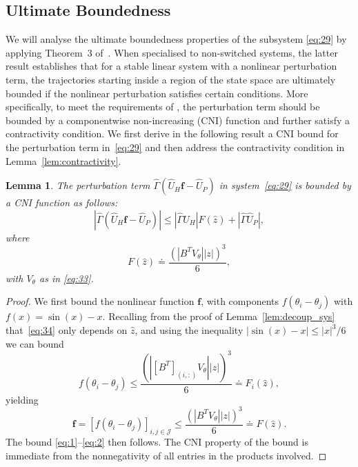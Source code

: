 \documentclass[letter, 10pt, conference]{ieeeconf}
\newtheorem{lemma}[theorem]{Lemma}
\newcommand{\J}{\mathcal{J}}
\newcommand{\1}{\mathbf{1}}
\newcommand{\0}{\mathbf{0}}
\begin{document}
{\subsection{Ultimate Boundedness}
\label{subsec:UB}
We will analyse the ultimate boundedness properties of the subsystem
\eqref{eq:29} by applying Theorem~3 of~\cite{HaS13}. When specialised
to non-switched systems, the latter result establishes that for a
stable linear system with a nonlinear perturbation term, the trajectories
starting inside a region of the state space are ultimately bounded if
the nonlinear perturbation satisfies certain conditions.  
More specifically, to meet the requirements of \cite[Theorem~3]{HaS13},
the perturbation term should be bounded by a componentwise non-increasing
(CNI) function and further satisfy a contractivity condition. 
We first derive in the following result a CNI
bound for the perturbation term in~\eqref{eq:29} and then address the
contractivity condition in Lemma~\ref{lem:contractivity}.


\begin{lemma}
  \label{lem:CNIfcn}
  The perturbation term $\hat{\Gamma} (\hat{U}_H
  \mathbf{f}-\hat{U}_P)$ in system~\eqref{eq:29} is bounded by a CNI
  function as follows:
  \begin{equation}
    \label{eq:1}
    |\hat{\Gamma}(\hat{U}_H \mathbf{f}-\hat{U}_P)|\le |\hat{\Gamma}\hat{U}_H|
    F(\hat{z}) +  |\hat{\Gamma} \hat{U}_P|, 
  \end{equation}
where
\begin{equation}
  \label{eq:2}
  F(\hat{z}) \doteq  \frac{(|B^T V_\theta||z|)^3}{6},
\end{equation}
  with $V_\theta$ as in \eqref{eq:33}.
\end{lemma}
 \begin{proof}
  We first  bound the nonlinear function $\mathbf{f}$, with
  components $f(\theta_i-\theta_j)$ with $f(x)=\sin(x)-x$.
  Recalling from the proof of Lemma~\ref{lem:decoup_sys}
  that~\eqref{eq:34} only depends on $\hat{z}$, and using the
  inequality $|\sin(x)-x|\le|x|^3/6$ we can bound
  \begin{equation}
	\label{eq:36}
	f(\theta_i-\theta_j) 
	\le \frac{(|{[B^T]}_{(i,:)} V_\theta||z|)^3}{6} 
	 \doteq F_i(\hat{z}),
  \end{equation}
  yielding
  \begin{equation}
	\label{eq:37}
	\mathbf{f}=[f(\theta_i-\theta_j)]_{i,j\in\J}
	\le \frac{(|B^T V_\theta||z|)^3}{6} \doteq F(\hat{z}).
  \end{equation}
  The bound \eqref{eq:1}--\eqref{eq:2} then follows. The CNI property
  of the bound is immediate from the nonnegativity of all entries in
  the products involved.
\end{proof}

}
\end{document}
